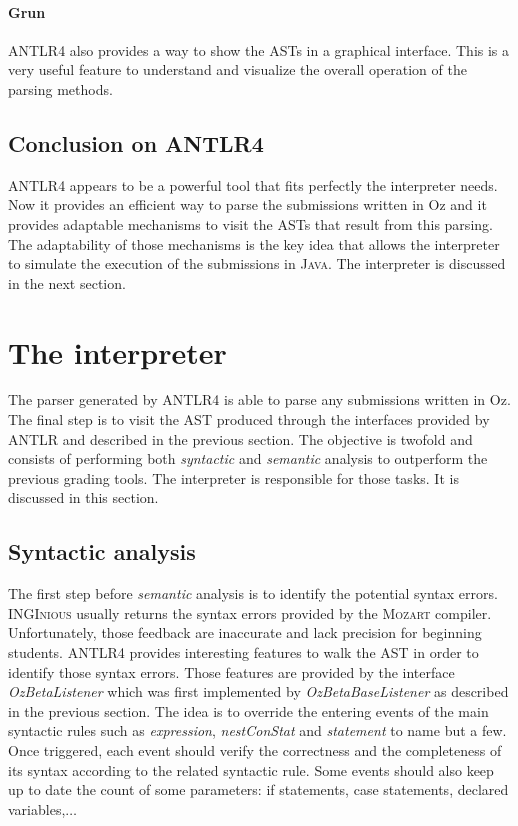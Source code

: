 \documentclass[11pt,a4paper,twoside,openright]{report}
\begin{document}
\paragraph{Grun}
\textsc{ANTLR4} also provides a way to show the ASTs in a graphical interface. 
This is a very useful feature to understand and visualize the overall operation 
of the parsing methods.

\subsection{Conclusion on ANTLR4}

\textsc{ANTLR4} appears to be a powerful tool that fits perfectly the 
interpreter needs. Now it provides an efficient way to parse the submissions 
written in Oz and it provides adaptable mechanisms to visit the ASTs that 
result from this parsing. The adaptability of those mechanisms is the key idea 
that allows the interpreter to simulate the execution of the submissions in 
\textsc{Java}. The interpreter is discussed in the next section.

\section{The interpreter}

The parser generated by \textsc{ANTLR4} is able to parse any submissions
written in Oz. The final step is to visit the AST produced through the 
interfaces provided by \textsc{ANTLR} and described in the previous section. 
The objective is twofold and consists of performing both \textit{syntactic} and 
\textit{semantic} analysis to outperform the previous grading tools. The 
interpreter is responsible for those tasks. It is discussed in this section.

\subsection{Syntactic analysis} \label{ssec:syn}

The first step before \textit{semantic} analysis is to identify the potential 
syntax errors. \textsc{INGInious} usually returns the syntax errors provided 
by the \textsc{Mozart} compiler. Unfortunately, those feedback are inaccurate 
and lack precision for beginning students. \textsc{ANTLR4} provides 
interesting features to walk the AST in order to identify those syntax errors. 
Those features are provided by the interface \textit{OzBetaListener} which was 
first implemented by \textit{OzBetaBaseListener} as described in the 
previous section. The idea is to override the entering events 
of the main syntactic rules such as \textit{expression}, \textit{nestConStat} 
and \textit{statement} to name but a few. Once triggered, each event should 
verify the correctness and the completeness of its syntax according to the 
related syntactic rule. Some events should also keep up to date the count of 
some parameters: if statements, case statements, declared variables,$\hdots$\\
\end{document}
